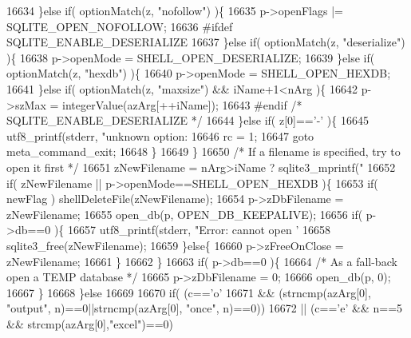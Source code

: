 \begin{DoxyCode}
{{{{{{{{{{{{{{{{{{{{{{{{{{{{{{{{{{{{{{{{{{{{{{{{{{{{{{{{{16634       \}\textcolor{keywordflow}{else} \textcolor{keywordflow}{if}( optionMatch(z, \textcolor{stringliteral}{"nofollow"}) )\{
16635         p->openFlags |= SQLITE_OPEN_NOFOLLOW;
16636 \textcolor{preprocessor}{#ifdef SQLITE\_ENABLE\_DESERIALIZE}
16637       \}\textcolor{keywordflow}{else} \textcolor{keywordflow}{if}( optionMatch(z, \textcolor{stringliteral}{"deserialize"}) )\{
16638         p->openMode = SHELL_OPEN_DESERIALIZE;
16639       \}\textcolor{keywordflow}{else} \textcolor{keywordflow}{if}( optionMatch(z, \textcolor{stringliteral}{"hexdb"}) )\{
16640         p->openMode = SHELL_OPEN_HEXDB;
16641       \}\textcolor{keywordflow}{else} \textcolor{keywordflow}{if}( optionMatch(z, \textcolor{stringliteral}{"maxsize"}) && iName+1<nArg )\{
16642         p->szMax = integerValue(azArg[++iName]);
16643 \textcolor{preprocessor}{#endif }\textcolor{comment}{/* SQLITE\_ENABLE\_DESERIALIZE */}\textcolor{preprocessor}{}
16644       \}\textcolor{keywordflow}{else} \textcolor{keywordflow}{if}( z[0]==\textcolor{charliteral}{'-'} )\{
16645         utf8_printf(stderr, \textcolor{stringliteral}{"unknown option: %
16646         rc = 1;
16647         \textcolor{keywordflow}{goto} meta\_command\_exit;
16648       \}
16649     \}
16650     \textcolor{comment}{/* If a filename is specified, try to open it first */}
16651     zNewFilename = nArg>iName ? sqlite3_mprintf(\textcolor{stringliteral}{"%
16652     \textcolor{keywordflow}{if}( zNewFilename || p->openMode==SHELL_OPEN_HEXDB )\{
16653       \textcolor{keywordflow}{if}( newFlag ) shellDeleteFile(zNewFilename);
16654       p->zDbFilename = zNewFilename;
16655       open_db(p, OPEN_DB_KEEPALIVE);
16656       \textcolor{keywordflow}{if}( p->db==0 )\{
16657         utf8_printf(stderr, \textcolor{stringliteral}{"Error: cannot open '%
16658         sqlite3_free(zNewFilename);
16659       \}\textcolor{keywordflow}{else}\{
16660         p->zFreeOnClose = zNewFilename;
16661       \}
16662     \}
16663     \textcolor{keywordflow}{if}( p->db==0 )\{
16664       \textcolor{comment}{/* As a fall-back open a TEMP database */}
16665       p->zDbFilename = 0;
16666       open_db(p, 0);
16667     \}
16668   \}\textcolor{keywordflow}{else}
16669 
16670   \textcolor{keywordflow}{if}( (c==\textcolor{charliteral}{'o'}
16671         && (strncmp(azArg[0], \textcolor{stringliteral}{"output"}, n)==0||strncmp(azArg[0], \textcolor{stringliteral}{"once"}, n)==0))
16672    || (c==\textcolor{charliteral}{'e'} && n==5 && strcmp(azArg[0],\textcolor{stringliteral}{"excel"})==0)
}}}}}}}}}}}}}}}}}}}}}}}}}}}}}}}}}}}}}}}}}}}}}}}}}}}}}}}}}}}}
\end{DoxyCode}
